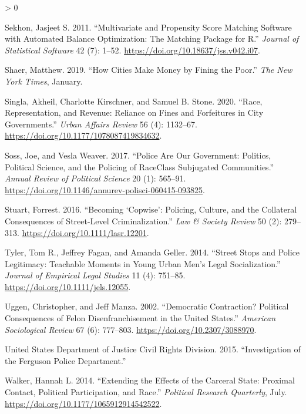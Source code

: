 \documentclass[
  12pt,
]{article}
\newlength{\cslhangindent}
\newenvironment{CSLReferences}[2] %
 {%
  \setlength{\parindent}{0pt}
  \ifodd #1 \everypar{\setlength{\hangindent}{\cslhangindent}}\ignorespaces\fi
  \ifnum #2 > 0
  \setlength{\parskip}{#2\baselineskip}
  \fi
 }%
 {}
\begin{document}
\begin{CSLReferences}{1}{0}
\leavevmode\hypertarget{ref-Sekhon2011}{}%
Sekhon, Jasjeet S. 2011. {``Multivariate and {Propensity Score Matching Software} with {Automated Balance Optimization}: {The Matching} Package for {R}.''} \emph{Journal of Statistical Software} 42 (7): 1--52. \url{https://doi.org/10.18637/jss.v042.i07}.

\leavevmode\hypertarget{ref-Shaer2019}{}%
Shaer, Matthew. 2019. {``How {Cities Make Money} by {Fining} the {Poor}.''} \emph{The New York Times}, January.

\leavevmode\hypertarget{ref-Singla2020}{}%
Singla, Akheil, Charlotte Kirschner, and Samuel B. Stone. 2020. {``Race, {Representation}, and {Revenue}: {Reliance} on {Fines} and {Forfeitures} in {City Governments}.''} \emph{Urban Affairs Review} 56 (4): 1132--67. \url{https://doi.org/10.1177/1078087419834632}.

\leavevmode\hypertarget{ref-Soss2017}{}%
Soss, Joe, and Vesla Weaver. 2017. {``Police {Are Our Government}: {Politics}, {Political Science}, and the {Policing} of {Race}{{Class Subjugated Communities}}.''} \emph{Annual Review of Political Science} 20 (1): 565--91. \url{https://doi.org/10.1146/annurev-polisci-060415-093825}.

\leavevmode\hypertarget{ref-Stuart2016}{}%
Stuart, Forrest. 2016. {``Becoming {`{Copwise}'}: {Policing}, {Culture}, and the {Collateral Consequences} of {Street-Level Criminalization}.''} \emph{Law \& Society Review} 50 (2): 279--313. \url{https://doi.org/10.1111/lasr.12201}.

\leavevmode\hypertarget{ref-Tyler2014}{}%
Tyler, Tom R., Jeffrey Fagan, and Amanda Geller. 2014. {``Street {Stops} and {Police Legitimacy}: {Teachable Moments} in {Young Urban Men}'s {Legal Socialization}.''} \emph{Journal of Empirical Legal Studies} 11 (4): 751--85. \url{https://doi.org/10.1111/jels.12055}.

\leavevmode\hypertarget{ref-Uggen2002}{}%
Uggen, Christopher, and Jeff Manza. 2002. {``Democratic {Contraction}? {Political Consequences} of {Felon Disenfranchisement} in the {United States}.''} \emph{American Sociological Review} 67 (6): 777--803. \url{https://doi.org/10.2307/3088970}.

\leavevmode\hypertarget{ref-UnitedStatesDepartmentofJusticeCivilRightsDivision2015}{}%
United States Department of Justice Civil Rights Division. 2015. {``Investigation of the {Ferguson Police Department}.''}

\leavevmode\hypertarget{ref-Walker2014}{}%
Walker, Hannah L. 2014. {``Extending the {Effects} of the {Carceral State}: {Proximal Contact}, {Political Participation}, and {Race}.''} \emph{Political Research Quarterly}, July. \url{https://doi.org/10.1177/1065912914542522}.


\end{CSLReferences}
\end{document}
